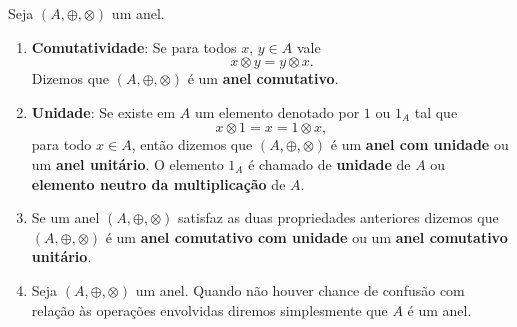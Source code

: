 \begin{observacoes}
    Seja $(A, \oplus, \otimes)$ um anel.
    \begin{enumerate}[label={\arabic*})]
        \item \textbf{Comutatividade}: Se para todos $x$, $y \in A$ vale
        \[
            x \otimes y = y \otimes x.
        \]
        Dizemos que $(A, \oplus, \otimes)$ {\'e} um \textbf{anel comutativo}.

        \item \textbf{Unidade}: Se existe em $A$ um elemento denotado por $1$ ou $1_{A}$ tal que \[ x \otimes 1 = x = 1 \otimes x, \] para todo $x \in A$, ent{\~a}o dizemos que
            $(A, \oplus, \otimes)$ \'e um \textbf{anel com unidade} ou um \textbf{anel unit{\'a}rio}. O elemento $1_A$ {\'e} chamado de \textbf{unidade} de $A$ ou
            \textbf{elemento neutro da multiplica\c{c}\~ao} de $A$.

        \item Se um anel $(A, \oplus, \otimes)$ satisfaz as duas propriedades anteriores dizemos que $(A, \oplus, \otimes)$ \'e um \textbf{anel comutativo com unidade} ou um
            \textbf{anel comutativo unit\'ario}.


        \item Seja $(A, \oplus, \otimes)$ um anel. Quando n\~ao houver chance de confus\~ao com rela\c{c}\~ao \`as opera\c{c}\~oes envolvidas diremos simplesmente que $A$ \'e um anel.
    \end{enumerate}
\end{observacoes}

